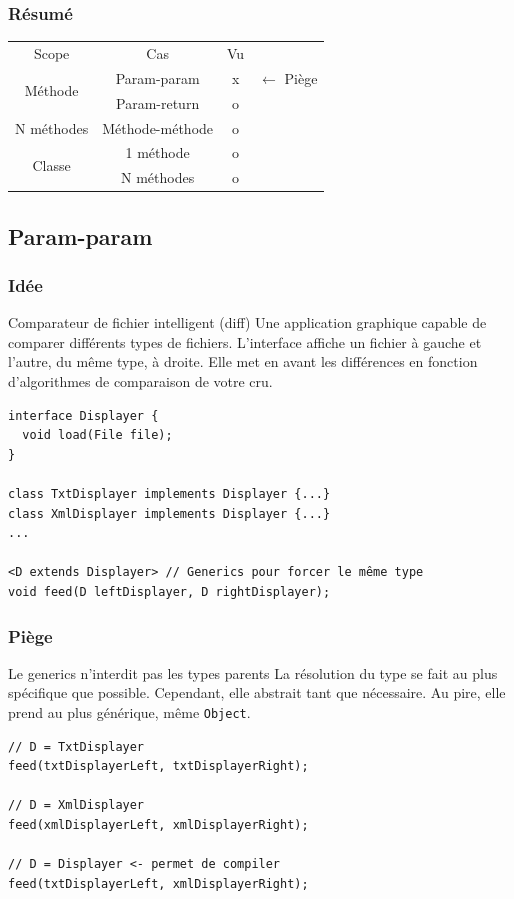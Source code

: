 \documentclass[draft]{beamer}
\begin{document}
\begin{frame}
\frametitle{Résumé}
\begin{table}
  \begin{tabular}{|c|c|c|l}
    \cline{1-3}
    Scope                    & Cas             & Vu \\
    \cline{1-3}
    \multirow{2}{*}{Méthode} & Param-param     & x  & $\leftarrow$ Piège\\
    \cline{2-3}
    ~                        & Param-return    & o  \\
    \cline{1-3}
    N méthodes               & Méthode-méthode & o  \\
    \cline{1-3}
    \multirow{2}{*}{Classe}  & 1 méthode       & o  \\
    \cline{2-3}
    ~                        & N méthodes      & o  \\
    \cline{1-3}
  \end{tabular}
\end{table}
\end{frame}

\subsection{Param-param}

\begin{frame}[fragile]
\frametitle{Idée}
\begin{block}{Comparateur de fichier intelligent (diff)}
 Une application graphique capable de comparer différents types de fichiers.
 L'interface affiche un fichier à gauche et l'autre, du même type, à droite.
 Elle met en avant les différences en fonction d'algorithmes de comparaison de votre cru.
\end{block}
\begin{lstlisting}
interface Displayer {
  void load(File file);
}

class TxtDisplayer implements Displayer {...}
class XmlDisplayer implements Displayer {...}
...

<D extends Displayer> // Generics pour forcer le même type
void feed(D leftDisplayer, D rightDisplayer);
\end{lstlisting}
\end{frame}

\begin{frame}[fragile]
\frametitle{Piège}
\begin{alertblock}{Le generics n'interdit pas les types parents}
 La résolution du type se fait au plus spécifique que possible.
 Cependant, elle abstrait tant que nécessaire.
 Au pire, elle prend au plus générique, même \lstinline{Object}.
\end{alertblock}
\begin{lstlisting}
// D = TxtDisplayer
feed(txtDisplayerLeft, txtDisplayerRight);

// D = XmlDisplayer
feed(xmlDisplayerLeft, xmlDisplayerRight);

// D = Displayer <- permet de compiler
feed(txtDisplayerLeft, xmlDisplayerRight);
\end{lstlisting}
\end{frame}
\end{document}
